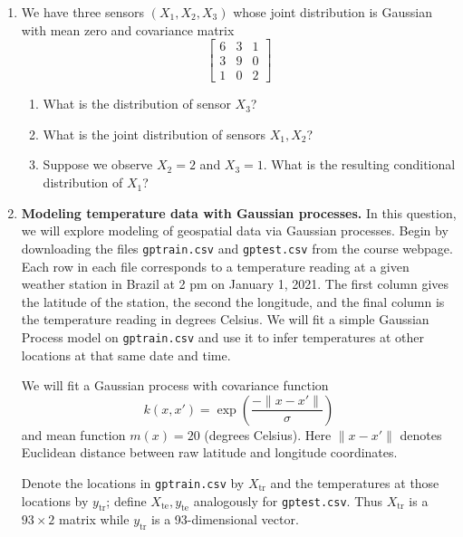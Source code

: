 \documentclass{article}
\begin{document}
\begin{enumerate}
\item We have three sensors $(X_1, X_2, X_3)$ whose joint distribution is Gaussian with mean zero and covariance matrix
    \[
    \begin{bmatrix}
    6 & 3 & 1 \\
    3 & 9 & 0 \\
    1 & 0 & 2
    \end{bmatrix}
    \]
    \begin{enumerate}
    \item What is the distribution of sensor $X_3$?
    \item What is the joint distribution of sensors $X_1, X_2$?
    \item Suppose we observe $X_2=2$ and $X_3=1$. What is the resulting conditional distribution of $X_1$?
    \end{enumerate}

\item \textbf{Modeling temperature data with Gaussian processes.} In this question, we will explore modeling of geospatial data via Gaussian processes. Begin by downloading the files \texttt{gptrain.csv} and \texttt{gptest.csv} from the course webpage. Each row in each file corresponds to a temperature reading at a given weather station in Brazil at 2 pm on January 1, 2021. The first column gives the latitude of the station, the second the longitude, and the final column is the temperature reading in degrees Celsius. We will fit a simple Gaussian Process model on \texttt{gptrain.csv} and use it to infer temperatures at other locations at that same date and time.

We will fit a Gaussian process with covariance function
\[
k(x, x') = \exp\left(\frac{-\|x-x'\|}{\sigma}\right)
\]
and mean function $m(x) = 20$ (degrees Celsius). Here $\|x-x'\|$ denotes Euclidean distance between raw latitude and longitude coordinates.

Denote the locations in \texttt{gptrain.csv} by $X_{\text{tr}}$ and the temperatures at those locations by $y_{\text{tr}}$; define $X_{\text{te}}, y_{\text{te}}$ analogously for \texttt{gptest.csv}. Thus $X_{\text{tr}}$ is a $93 \times 2$ matrix while $y_{\text{tr}}$ is a 93-dimensional vector.


\end{enumerate}
\end{document}
